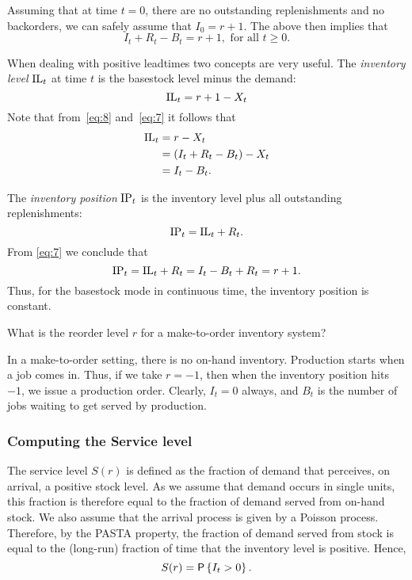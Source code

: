 Assuming that at time $t=0$,
there are no outstanding replenishments and no backorders, we can
safely assume that $I_0 = r+1$. The above then implies that
\begin{equation}
  \label{eq:7}
   I_t + R_t - B_t = r+1, \text{ for all }  t\geq 0.
\end{equation}


When dealing with positive leadtimes two concepts are very useful. The \emph{inventory level} $\textrm{IL}_t$ at time $t$ is the basestock level minus the demand: 
\begin{equation}\label{eq:23}
  \textrm{IL}_t = r+1 - X_t
\end{equation}
Note that from~\eqref{eq:8} and~\eqref{eq:7} it follows that
\begin{equation*}
  \begin{split}
  \textrm{IL}_t 
&=r - X_t \\
&= (I_t + R_t - B_t) - X_t \\
&= I_t - B_t.
  \end{split}
\end{equation*}


The \emph{inventory position} $\textrm{IP}_t$ is the inventory level plus all outstanding replenishments:
\begin{equation*}
  \textrm{IP}_t = \textrm{IL}_t + R_t.
\end{equation*}
From \eqref{eq:7} we conclude that 
\begin{equation}\label{eq:20}
\textrm{IP}_t =\textrm{IL}_t + R_t = I_t - B_t +R_t = r+1.
\end{equation}
Thus, for the basestock mode in continuous time, the inventory position is constant. 


\begin{question}
  What is the reorder level $r$ for a make-to-order inventory system?
\end{question}
\begin{solution}
  In a make-to-order setting, there is no on-hand
  inventory. Production starts when a job comes in. Thus, if we take
  $r=-1$, then when the inventory position hits $-1$, we issue a
  production order. Clearly, $I_t=0$ always, and $B_t$ is the number
  of jobs waiting to get served by production.
\end{solution}


\subsubsection{Computing the Service level}

The service level $S(r)$ is defined as the fraction of demand that
perceives, on arrival, a positive stock level. As we assume that demand
occurs in single units, this fraction is therefore equal to the fraction
of demand served from on-hand stock. We also assume that the arrival
process is given by a Poisson process. Therefore, by the PASTA property,
the fraction of demand served from stock is equal to the (long-run)
fraction of time that the inventory level is positive. Hence,
\begin{equation*}
   S(r) = \P{I_t >0}.
\end{equation*}

